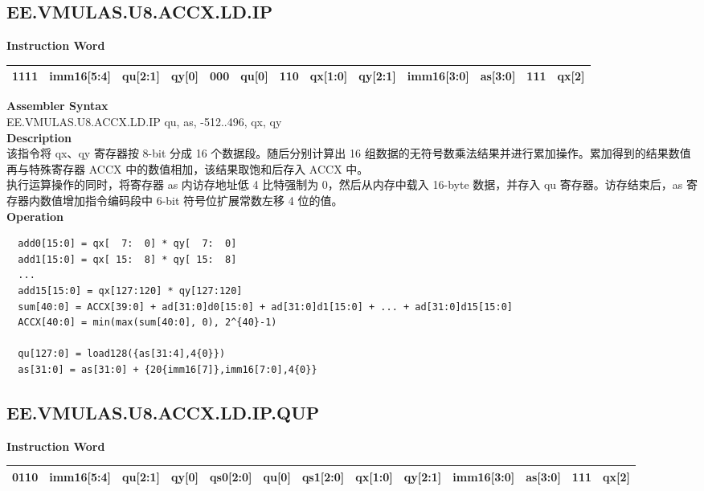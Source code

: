 \clearpage
\subsection{EE.VMULAS.U8.ACCX.LD.IP}\label{instruction:EEVMULASU8ACCXLDIP}
\setlength\tabcolsep{6pt}
\textbf{Instruction Word} \\
\begin{tabular}{|c|c|c|c|c|c|c|c|c|c|c|c|c|}
	\hline
	1111 & imm16[5:4] & qu[2:1] & qy[0] & 000 & qu[0] & 110 & qx[1:0] & qy[2:1] & imm16[3:0] & as[3:0] & 111 & qx[2] \\
	\hline
\end{tabular}

\textbf{Assembler Syntax} \\
EE.VMULAS.U8.ACCX.LD.IP qu, as, -512..496, qx, qy \\
\textbf{Description} \\
该指令将 qx、qy 寄存器按 8-bit 分成 16 个数据段。随后分别计算出 16 组数据的无符号数乘法结果并进行累加操作。累加得到的结果数值再与特殊寄存器 ACCX 中的数值相加，该结果取饱和后存入 ACCX 中。\\ 执行运算操作的同时，将寄存器 as 内访存地址低 4 比特强制为 0，然后从内存中载入 16-byte 数据，并存入 qu 寄存器。访存结束后，as 寄存器内数值增加指令编码段中 6-bit 符号位扩展常数左移 4 位的值。\\
\textbf{Operation}
\begin{lstlisting}
  add0[15:0] = qx[  7:  0] * qy[  7:  0]
  add1[15:0] = qx[ 15:  8] * qy[ 15:  8]
  ...
  add15[15:0] = qx[127:120] * qy[127:120]
  sum[40:0] = ACCX[39:0] + ad[31:0]d0[15:0] + ad[31:0]d1[15:0] + ... + ad[31:0]d15[15:0]
  ACCX[40:0] = min(max(sum[40:0], 0), 2^{40}-1)

  qu[127:0] = load128({as[31:4],4{0}})
  as[31:0] = as[31:0] + {20{imm16[7]},imm16[7:0],4{0}}
\end{lstlisting}

\clearpage
\subsection{EE.VMULAS.U8.ACCX.LD.IP.QUP}\label{instruction:EEVMULASU8ACCXLDIPQUP}
\setlength\tabcolsep{5pt}
\textbf{Instruction Word} \\
\begin{tabular}{|c|c|c|c|c|c|c|c|c|c|c|c|c|}
	\hline
	0110 & imm16[5:4] & qu[2:1] & qy[0] & qs0[2:0] & qu[0] & qs1[2:0] & qx[1:0] & qy[2:1] & imm16[3:0] & as[3:0] & 111 & qx[2] \\
	\hline
\end{tabular}

